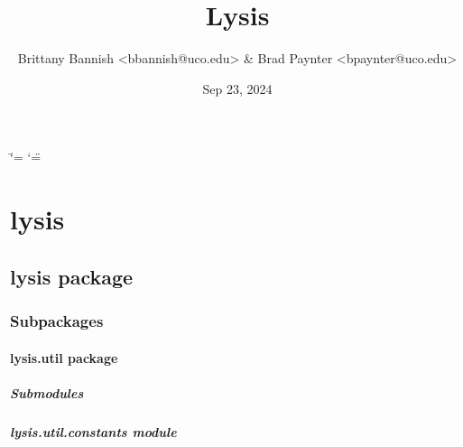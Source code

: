 \documentclass[letterpaper,10pt,english]{sphinxmanual}
\title{Lysis}
\date{Sep 23, 2024}
\author{Brittany Bannish \textless{}bbannish@uco.edu\textgreater{} \& Brad Paynter \textless{}bpaynter@uco.edu\textgreater{}}
\begin{document}
\ifdefined\shorthandoff
  \ifnum\catcode`\=\string=\active\shorthandoff{=}\fi
  \ifnum\catcode`\"=\active{}\fi
\fi

\pagestyle{empty}
\sphinxmaketitle
\pagestyle{plain}
\sphinxtableofcontents
\pagestyle{normal}
\label{\detokenize{index::doc}}


\sphinxstepscope


\chapter{lysis}
\label{\detokenize{modules:lysis}}\label{\detokenize{modules::doc}}
\sphinxstepscope


\section{lysis package}
\label{\detokenize{lysis:lysis-package}}\label{\detokenize{lysis::doc}}

\subsection{Subpackages}
\label{\detokenize{lysis:subpackages}}
\sphinxstepscope


\subsubsection{lysis.util package}
\label{\detokenize{lysis.util:lysis-util-package}}\label{\detokenize{lysis.util::doc}}

\paragraph{Submodules}
\label{\detokenize{lysis.util:submodules}}

\paragraph{lysis.util.constants module}
\label{\detokenize{lysis.util:module-lysis.util.constants}}\label{\detokenize{lysis.util:lysis-util-constants-module}}
\end{document}
